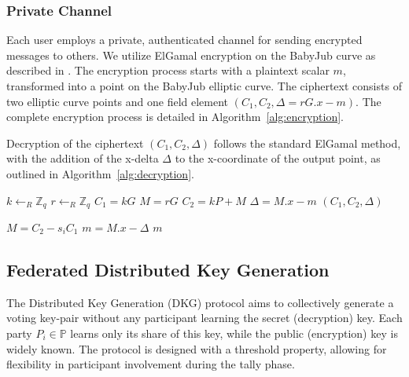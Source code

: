 \documentclass[runningheads]{llncs}
\begin{document}
\subsubsection{Private Channel}
Each user employs a private, authenticated channel for sending encrypted messages to others. We utilize ElGamal encryption on the BabyJub curve as described in \cite{ElGamalEncryptionDecryption2020,jieWeijiekohElgamalbabyjub2023}. The encryption process starts with a plaintext scalar $m$, transformed into a point on the BabyJub elliptic curve. The ciphertext consists of two elliptic curve points and one field element $(C_1, C_2, \Delta=rG.x - m)$. The complete encryption process is detailed in Algorithm~\ref{alg:encryption}.

Decryption of the ciphertext $(C_1, C_2, \Delta)$ follows the standard ElGamal method, with the addition of the x-delta $\Delta$ to the x-coordinate of the output point, as outlined in Algorithm~\ref{alg:decryption}.

\begin{algorithm}
    \caption{$\texttt{Enc}_{P_i}$}
    \label{alg:encryption}
    
    
    $k \gets_R \mathbb{Z}_q$\;
    $r \gets_R \mathbb{Z}_q$\;
    $C_1 = kG$\;
    $M = rG$\;
    $C_2 = kP + M$\;
    $\Delta = M.x - m$\;
    \Return $(C_1, C_2, \Delta)$
\end{algorithm}

\begin{algorithm}
    \caption{$\texttt{Dec}_{s_i}$}
    \label{alg:decryption}
    
    
    $M = C_2 - s_i C_1$\;
    $m = M.x - \Delta$\;
    \Return $m$
\end{algorithm}


\subsection{Federated Distributed Key Generation}
The Distributed Key Generation (DKG) protocol aims to collectively generate a voting key-pair without any participant learning the secret (decryption) key. Each party $P_i \in \mathbb{P}$ learns only its share of this key, while the public (encryption) key is widely known. The protocol is designed with a threshold property, allowing for flexibility in participant involvement during the tally phase.
\end{document}

